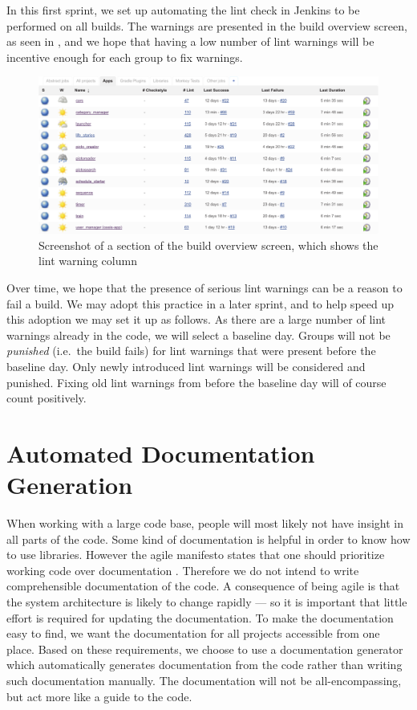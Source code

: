 In this first sprint, we set up automating the lint check in Jenkins to be performed on all builds. The warnings are presented in the build overview screen, as seen in , and we hope that having a low number of lint warnings will be incentive enough for each group to fix warnings.

\begin{figure}[htbp]
    \includegraphics[width=\textwidth]{graphics/jenkins-overview.pdf}
    \caption{Screenshot of a section of the build overview screen, which shows the lint warning column}
    \label{fig:jenkins-overview}
\end{figure}

Over time, we hope that the presence of serious lint warnings can be a reason to fail a build. We may adopt this practice in a later sprint, and to help speed up this adoption we may set it up as follows. As there are a large number of lint warnings already in the code, we will select a baseline day. Groups will not be \emph{punished} (i.e.\ the build fails) for lint warnings that were present before the baseline day. Only newly introduced lint warnings will be considered and punished. Fixing old lint warnings from before the baseline day will of course count positively.

\section{Automated Documentation Generation}\label{sec:automated_documentation_gen}
When working with a large code base, people will most likely not have insight in all parts of the code. Some kind of documentation is helpful in order to know how to use libraries. However the agile manifesto states that one should prioritize working code over documentation \parencite{agile-manifesto-web}. Therefore we do not intend to write comprehensible documentation of the code. A consequence of being agile is that the system architecture is likely to change rapidly --- so it is important that little effort is required for updating the documentation. To make the documentation easy to find, we want the documentation for all projects accessible from one place. Based on these requirements, we choose to use a documentation generator which automatically generates documentation from the code rather than writing such documentation manually. The documentation will not be all-encompassing, but act more like a guide to the code.

